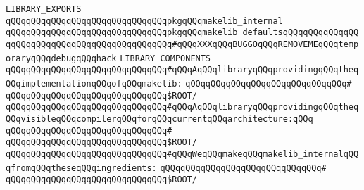 \newline
\verb|LIBRARY_EXPORTS|\newline
\newline
\verb|qQQqqQQqqQQqqQQqqQQqqQQqqQQqqQQqpkgqQQqmakelib_internal|\newline
\verb|qQQqqQQqqQQqqQQqqQQqqQQqqQQqqQQqpkgqQQqmakelib_defaultsqQQqqQQqqQQqqQQqqQQqqQQqqQQqqQQqqQQqqQQqqQQqqQQq#qQQqXXXqQQqBUGGOqQQqREMOVEMEqQQqtemporaryqQQqdebugqQQqhack|\newline
\newline
\newline
\verb|LIBRARY_COMPONENTS|\newline
\newline
\verb|qQQqqQQqqQQqqQQqqQQqqQQqqQQqqQQq#qQQqAqQQqlibraryqQQqprovidingqQQqtheqQQqimplementationqQQqofqQQqmakelib:|\newline
\verb|qQQqqQQqqQQqqQQqqQQqqQQqqQQqqQQq#|\newline
\verb|qQQqqQQqqQQqqQQqqQQqqQQqqQQqqQQq$ROOT/|\newline
\newline
\verb|qQQqqQQqqQQqqQQqqQQqqQQqqQQqqQQq#qQQqAqQQqlibraryqQQqprovidingqQQqtheqQQqvisibleqQQqcompilerqQQqforqQQqcurrentqQQqarchitecture:qQQq|\newline
\verb|qQQqqQQqqQQqqQQqqQQqqQQqqQQqqQQq#|\newline
\verb|qQQqqQQqqQQqqQQqqQQqqQQqqQQqqQQq$ROOT/|\newline
\newline
\verb|qQQqqQQqqQQqqQQqqQQqqQQqqQQqqQQq#qQQqWeqQQqmakeqQQqmakelib_internalqQQqfromqQQqtheseqQQqingredients:|\newline
\verb|qQQqqQQqqQQqqQQqqQQqqQQqqQQqqQQq#|\newline
\verb|qQQqqQQqqQQqqQQqqQQqqQQqqQQqqQQq$ROOT/|\newline

